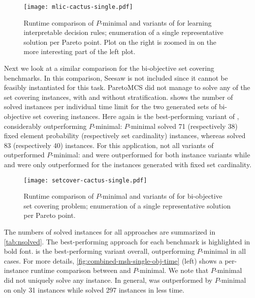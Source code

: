 \begin{figure}
    \centering
    \texttt{[image: mlic-cactus-single.pdf]}
    \caption{Runtime comparison of $P$-minimal and variants of \algname{} for learning interpretable decision rules;
      enumeration of a single representative solution per Pareto point.
      Plot on the right is zoomed in on the more interesting part of the left plot.
    }\label{fig:mlic-cactus-single}
\end{figure}

Next we look at a similar comparison for the bi-objective set covering benchmarks.
In this comparison, Seesaw is not included since it cannot be feasibly instantiated for this task.
ParetoMCS did not manage to solve any of the set covering instances, with and without stratification.
 shows the number of solved instances per individual time limit for the two generated sets of bi-objective set covering instances.
Here again \msh{} is the best-performing variant of \algname{}, considerably outperforming $P$-minimal:
$P$-minimal solved 71 (respectively 38) fixed element probability (respectively set cardinality) instances, whereas \msh{} solved 83 (respectively 40) instances.
For this application, not all variants of \algname{} outperformed $P$-minimal:
\msu{} and \oll{} were outperformed for both instance variants while \satunsat{} and \unsatsat{} were only outperformed for the instances generated with fixed set cardinality.

\begin{figure}
    \centering
    \texttt{[image: setcover-cactus-single.pdf]}
    \caption{Runtime comparison of $P$-minimal and variants of \algname{} for bi-objective set covering problem;
      enumeration of a single representative solution per Pareto point.
    }\label{fig:setcover-cactus-single}
\end{figure}

The numbers of solved instances for all approaches are summarized in \cref{tab:nsolved}.
The best-performing approach for each benchmark is highlighted in bold font.
\msh{} is the best-performing \algname{} variant overall, outperforming $P$-minimal in all cases.
For more details, \cref{fig:combined-msh-single-obj-time} (left) shows a per-instance runtime comparison between \msh{} and $P$-minimal.
We note that $P$-minimal did not uniquely solve any instance.
In general, \msh{} was outperformed by $P$-minimal on only 31 instances while \msh{} solved 297 instances in less time.

